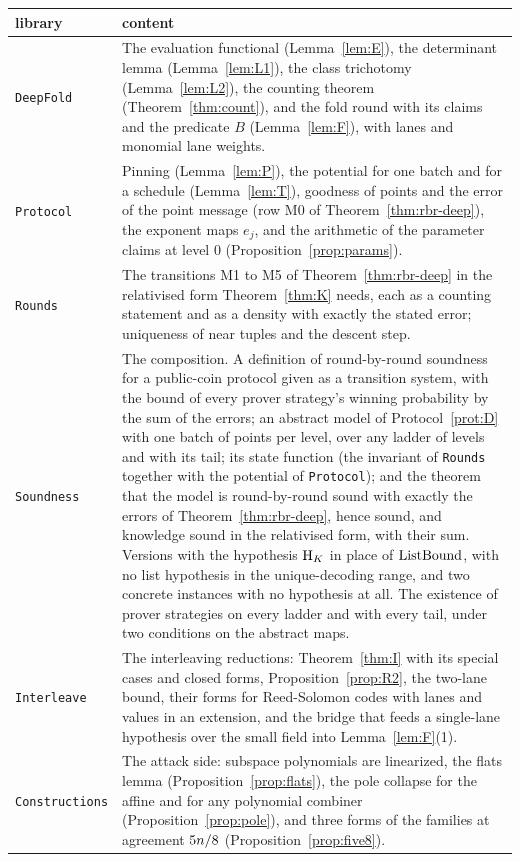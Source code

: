 \begin{center}
\begin{tabularx}{\textwidth}{@{}lX@{}}
\toprule
library & content\\
\midrule
\texttt{DeepFold} & The evaluation functional (Lemma~\ref{lem:E}), the determinant lemma (Lemma~\ref{lem:L1}), the class trichotomy (Lemma~\ref{lem:L2}), the counting theorem (Theorem~\ref{thm:count}), and the fold round with its claims and the predicate $B$ (Lemma~\ref{lem:F}), with lanes and monomial lane weights.\\
\texttt{Protocol} & Pinning (Lemma~\ref{lem:P}), the potential for one batch and for a schedule (Lemma~\ref{lem:T}), goodness of points and the error of the point message (row M0 of Theorem~\ref{thm:rbr-deep}), the exponent maps $e_j$, and the arithmetic of the parameter claims at level $0$ (Proposition~\ref{prop:params}).\\
\texttt{Rounds} & The transitions M1 to M5 of Theorem~\ref{thm:rbr-deep} in the relativised form Theorem~\ref{thm:K} needs, each as a counting statement and as a density with exactly the stated error; uniqueness of near tuples and the descent step.\\
\texttt{Soundness} & The composition. A definition of round-by-round soundness for a public-coin protocol given as a transition system, with the bound of every prover strategy's winning probability by the sum of the errors; an abstract model of Protocol~\ref{prot:D} with one batch of points per level, over any ladder of levels and with its tail; its state function (the invariant of \texttt{Rounds} together with the potential of \texttt{Protocol}); and the theorem that the model is round-by-round sound with exactly the errors of Theorem~\ref{thm:rbr-deep}, hence sound, and knowledge sound in the relativised form, with their sum. Versions with the hypothesis $\mathrm{H}_{K}$ in place of $\mathrm{ListBound}$, with no list hypothesis in the unique-decoding range, and two concrete instances with no hypothesis at all. The existence of prover strategies on every ladder and with every tail, under two conditions on the abstract maps.\\
\texttt{Interleave} & The interleaving reductions: Theorem~\ref{thm:I} with its special cases and closed forms, Proposition~\ref{prop:R2}, the two-lane bound, their forms for Reed-Solomon codes with lanes and values in an extension, and the bridge that feeds a single-lane hypothesis over the small field into Lemma~\ref{lem:F}(1).\\
\texttt{Constructions} & The attack side: subspace polynomials are linearized, the flats lemma (Proposition~\ref{prop:flats}), the pole collapse for the affine and for any polynomial combiner (Proposition~\ref{prop:pole}), and three forms of the families at agreement $5n/8$ (Proposition~\ref{prop:five8}).\\
\bottomrule
\end{tabularx}
\end{center}

